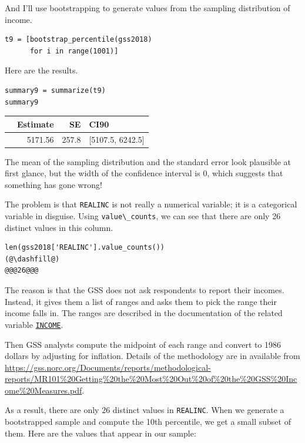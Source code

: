 And I'll use bootstrapping to generate values from the sampling
distribution of income.

\begin{lstlisting}[]
t9 = [bootstrap_percentile(gss2018)
      for i in range(1001)]
\end{lstlisting}

Here are the results.

\begin{lstlisting}[]
summary9 = summarize(t9)
summary9
\end{lstlisting}

\begin{tabular}{lrrl}
\midrule
{} &  Estimate &     SE &              CI90 \\
\midrule
{} &   5171.56 &  257.8 &  [5107.5, 6242.5] \\
\midrule
\end{tabular}

The mean of the sampling distribution and the standard error look
plausible at first glance, but the width of the confidence interval is
0, which suggests that something has gone wrong!

The problem is that \passthrough{\lstinline!REALINC!} is not really a
numerical variable; it is a categorical variable in disguise. Using
\passthrough{\lstinline!value\_counts!}, we can see that there are only
26 distinct values in this column.

\begin{lstlisting}[]
len(gss2018['REALINC'].value_counts())
(@\dashfill@)
@@@26@@@
\end{lstlisting}

The reason is that the GSS does not ask respondents to report their
incomes. Instead, it gives them a list of ranges and asks them to pick
the range their income falls in. The ranges are described in the
documentation of the related variable
\href{https://gssdataexplorer.norc.org/variables/104/vshow}{\passthrough{\lstinline!INCOME!}}.

Then GSS analysts compute the midpoint of each range and convert to 1986
dollars by adjusting for inflation. Details of the methodology are in
available from
\url{https://gss.norc.org/Documents/reports/methodological-reports/MR101\%20Getting\%20the\%20Most\%20Out\%20of\%20the\%20GSS\%20Income\%20Measures.pdf}.

As a result, there are only 26 distinct values in
\passthrough{\lstinline!REALINC!}. When we generate a bootstrapped
sample and compute the 10th percentile, we get a small subset of them.
Here are the values that appear in our sample:

